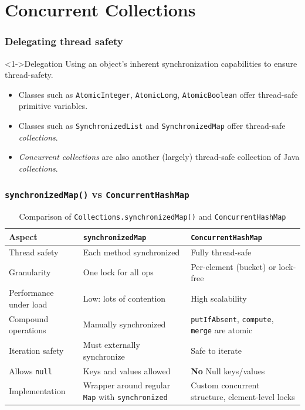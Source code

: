 \documentclass[xcolor={dvipsnames,svgnames},aspectratio=169]{beamer}
\begin{document}
\section{Concurrent Collections}

\begin{frame}[fragile]
  \frametitle{Delegating thread safety}

  \begin{block}<1->{\faBook \quad Delegation}
    Using an object's inherent synchronization capabilities to ensure thread-safety.
  \end{block}

  \vspace{0.4cm}
  \begin{itemize}
  \item[\faBook]<2-> Classes such as \texttt{AtomicInteger}, \texttt{AtomicLong},
    \texttt{AtomicBoolean} offer thread-safe primitive variables.
  \item[\faBook]<3-> Classes such as \texttt{SynchronizedList} and
    \texttt{SynchronizedMap} offer thread-safe \emph{collections}.
  \item[\faBook]<4-> \emph{Concurrent collections} are also another (largely)
    thread-safe collection of Java \emph{collections}.
  \end{itemize}
\end{frame}

\begin{frame}[fragile]
  \frametitle{\texttt{synchronizedMap()} vs \texttt{ConcurrentHashMap}}

  \begin{table}[h]
\centering
\begin{tabularx}{\textwidth}{|l|X|X|}
\hline
\textbf{Aspect} & \texttt{synchronizedMap} & \texttt{ConcurrentHashMap} \\
\hline
Thread safety & Each method synchronized & Fully thread-safe \\
\hline
Granularity & One lock for all ops & Per-element (bucket) or lock-free \\
\hline
Performance under load & Low: lots of contention & High scalability \\
\hline
Compound operations & Manually synchronized & \texttt{putIfAbsent},
\texttt{compute}, \texttt{merge} are atomic\\
\hline
Iteration safety & Must externally synchronize & Safe to iterate \\
\hline
Allows \texttt{null} & Keys and values allowed & \textbf{No} Null keys/values  \\
\hline
Implementation & Wrapper around regular \texttt{Map} with \texttt{synchronized}
& Custom concurrent structure, element-level locks\\
\hline
\end{tabularx}
\caption{Comparison of \texttt{Collections.synchronizedMap()} and \texttt{ConcurrentHashMap}}
\end{table}
\end{frame}
\end{document}
